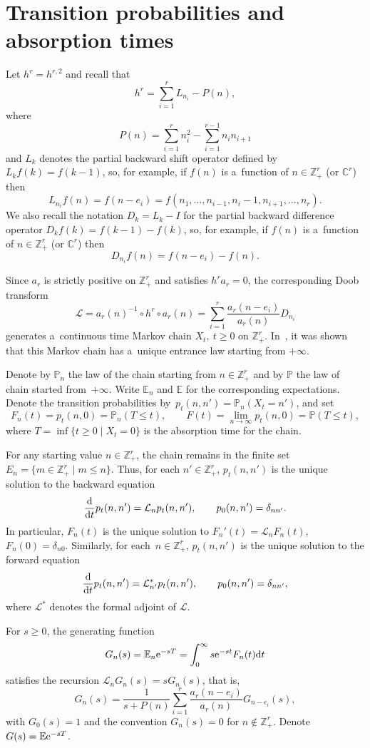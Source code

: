 \documentclass[pdftex]{sigma}
\theoremstyle{definition}
\newcommand{\C}{{\mathbb C}}
\newcommand\Z{{\mathbb Z}}
\newcommand\cL{{\mathcal L}}
\newcommand\E{{\mathbb E}}
\renewcommand\P{{\mathbb P}}
\begin{document}
\section{Transition probabilities and absorption times}\label{tpat}

Let $h^r=h^{r,2}$ and recall that
\[ h^{r} = \sum_{i=1}^r L_{n_i} - P(n),\]
where
\begin{equation}\label{P}
P(n)=\sum_{i=1}^r n_i^2 - \sum_{i=1}^{r-1} n_i n_{i+1}
\end{equation}
and $L_k$ denotes the partial backward shift operator defined by $L_k f(k) = f(k-1)$,
so, for example, if $f(n)$ is a~function of $n\in\Z_+^r$ (or $\C^r$) then
\[L_{n_i}f(n)=f(n-e_i)=f(n_1,\dots,n_{i-1},n_i-1,n_{i+1},\dots,n_r).\]
We also recall the notation $D_k = L_k-I$ for the partial backward difference operator
$D_k f(k) = f(k-1) - f(k)$, so, for example, if $f(n)$ is a~function of $n\in\Z_+^r$ (or $\C^r$) then
\[D_{n_i}f(n)=f(n-e_i)-f(n).\]

Since $a_r$ is strictly positive on $\Z_+^r$ and satisfies $h^r a_r=0$, the corresponding Doob transform
\[\cL=a_r(n)^{-1} \circ h^r \circ a_r(n) = \sum_{i=1}^r \frac{a_r(n-e_i)}{a_r(n)} D_{n_i}\]
generates a~continuous time Markov chain $X_t,\ t\ge 0$ on $\Z_+^r$.
In~\cite{noc23}, it was shown that this Markov chain has a~unique entrance
law starting from $+\infty$.

Denote by $\P_n$ the law of the chain starting from
$n\in\Z_+^r$ and by $\P$ the law of chain started from~$+\infty$.
Write $\E_n$ and $\E$ for the corresponding expectations.
Denote the transition probabilities by~$p_t(n,n')=\P_n(X_t=n')$,
and set
\[F_n(t)=p_t(n,0)=\P_n(T\le t),\qquad F(t)=\lim_{n\to\infty} p_t(n,0)=\P(T\le t),\]
where
$T=\inf\{t\ge 0\mid X_t=0\}$ is the absorption
time for the chain.

For any starting value $n\in\Z_+^r$, the chain remains in the finite set
$E_n=\{m\in\Z_+^r\mid m\le n\}$.
Thus, for each $n'\in\Z_+^r$, $p_t(n,n')$ is the unique solution to the backward equation
\[ \frac{\rm d}{{\rm d}t} p_t(n,n') = \cL_n p_t(n,n'),\qquad p_{0}(n,n')=\delta_{nn'}. \]
In particular, $F_n(t)$ is the unique solution to
$F_n'(t) = \cL_n F_n(t)$, $ F_n(0)=\delta_{n0}$.
Similarly, for each~${n\in\Z_+^r}$, $p_t(n,n')$ is the unique solution to the forward equation
\[ \frac{\rm d}{{\rm d}t} p_t(n,n') = \cL^*_{n'} p_t(n,n'),\qquad p_{0}(n,n')=\delta_{nn'}, \]
where $\cL^*$ denotes the formal adjoint of $\cL$.

For $s\ge 0$, the generating function
\[ G_n(s)=\E_n {\rm e}^{-s T} = \int_0^\infty s {\rm e}^{-s t} F_n(t) {\rm d}t\]
satisfies the recursion
$\cL_n G_n(s)=s G_n(s)$, that is,
\begin{equation}\label{g-rec}
G_n(s)=\frac1{s+P(n)} \sum_{i=1}^r \frac{a_r(n-e_i)}{a_r(n)} G_{n-e_i}(s),
\end{equation}
with $G_0(s)=1$ and the convention $G_n(s)=0$ for $n\notin\Z_+^r$.
Denote $G(s)=\E {\rm e}^{-s T}$.
\end{document}

